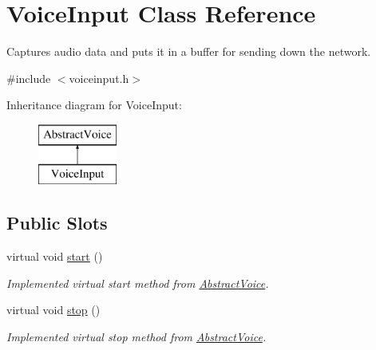 \hypertarget{class_voice_input}{
\section{\-Voice\-Input \-Class \-Reference}
\label{class_voice_input}
}


\-Captures audio data and puts it in a buffer for sending down the network.  




{\ttfamily \#include $<$voiceinput.\-h$>$}

\-Inheritance diagram for \-Voice\-Input\-:\begin{figure}[H]
\begin{center}
\leavevmode
\includegraphics[height=2.000000cm]{class_voice_input}
\end{center}
\end{figure}
\subsection*{\-Public \-Slots}
\begin{DoxyCompactItemize}
\item 
virtual void \hyperlink{class_voice_input_a99193e448e78f1bd10219bfb482d13ba}{start} ()
\begin{DoxyCompactList}\small\item\em \-Implemented virtual start method from \hyperlink{class_abstract_voice}{\-Abstract\-Voice}. \end{DoxyCompactList}\item 
virtual void \hyperlink{class_voice_input_aacdc744a4d9b156d79d05c7ea9361576}{stop} ()
\begin{DoxyCompactList}\small\item\em \-Implemented virtual stop method from \hyperlink{class_abstract_voice}{\-Abstract\-Voice}. \end{DoxyCompactList}\end{DoxyCompactItemize}
